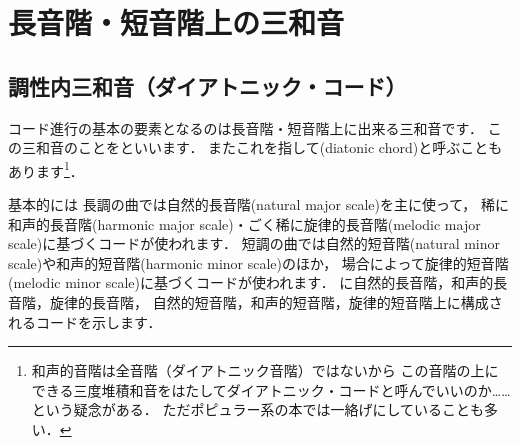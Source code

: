 \documentclass[dvipdfmx,uplatex,b5paper,openany,jbase=12Q,nomag*,textwidth-limit=44%
               ]{gachimuchi}[2020/05/05]
\begin{document}


%

\chapter{長音階・短音階上の三和音}
\section{調性内三和音（ダイアトニック・コード）}
コード進行の基本の要素となるのは長音階・短音階上に出来る三和音です．
この三和音のことをといいます\cite[p.23]{ptSHIMIZU1}．
またこれを指して\xkanjispace(diatonic chord)と呼ぶこともあります\footnote{
  和声的音階は全音階（ダイアトニック音階）ではないから
  この音階の上にできる三度堆積和音をはたしてダイアトニック・コードと呼んでいいのか……という疑念がある．
  ただポピュラー系の本では一絡げにしていることも多い．
}．

基本的には
長調の曲では自然的長音階(natural major scale)を主に使って，
稀に和声的長音階(harmonic major scale)・ごく稀に旋律的長音階(melodic major scale)に基づくコードが使われます．
短調の曲では自然的短音階(natural minor scale)や和声的短音階(harmonic minor scale)のほか，
場合によって旋律的短音階(melodic minor scale)に基づくコードが使われます．
に自然的長音階，和声的長音階，旋律的長音階，
自然的短音階，和声的短音階，旋律的短音階上に構成されるコードを示します．
\end{document}
